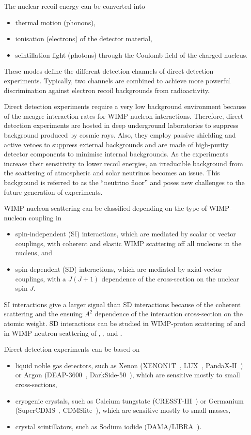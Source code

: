 The nuclear recoil energy can be converted into
\begin{itemize}
    \item thermal motion (phonons),
    \item ionisation (electrons) of the detector material,
    \item scintillation light (photons) through the Coulomb field of the charged nucleus.
\end{itemize}
These modes define the different detection channels of direct detection experiments. Typically, two channels are combined to achieve more powerful discrimination against electron recoil backgrounds from radioactivity.

Direct detection experiments require a very low background environment because of the meagre interaction rates for WIMP-nucleon interactions. Therefore, direct detection experiments are hosted in deep underground laboratories to suppress background produced by cosmic rays. Also, they employ passive shielding and active vetoes to suppress external backgrounds and are made of high-purity detector components to minimise internal backgrounds.
As the experiments increase their sensitivity to lower recoil energies, an irreducible background from the scattering of atmospheric and solar neutrinos becomes an issue. This background is referred to as the ``neutrino floor'' and poses new challenges to the future generation of experiments.

WIMP-nucleon scattering can be classified depending on the type of WIMP-nucleon coupling in
\begin{itemize}
    \item spin-independent (SI) interactions, which are mediated by scalar or vector couplings, with coherent and elastic WIMP scattering off all nucleons in the nucleus, and
    \item spin-dependent (SD) interactions, which are mediated by axial-vector couplings, with a \(J(J+1)\) dependence of the cross-section on the nuclear spin \(J\).
\end{itemize}
SI interactions give a larger signal than SD interactions because of the coherent scattering and the ensuing \(A^2\) dependence of the interaction cross-section on the atomic weight. SD interactions can be studied in WIMP-proton scattering of  and in WIMP-neutron scattering of , , and .

Direct detection experiments can be based on
\begin{itemize}
    \item liquid noble gas detectors, such as Xenon (XENON1T~\cite{Aprile2017}, LUX~\cite{Akerib2013}, PandaX-II~\cite{Tan2016}) or Argon (DEAP-3600~\cite{Amaudruz2018}, DarkSide-50~\cite{Agnes2018}), which are sensitive mostly to small cross-sections,
    \item cryogenic crystals, such as Calcium tungstate (CRESST-III~\cite{Abdelhameed2019}) or Germanium (SuperCDMS~\cite{Agnese2018}, CDMSlite~\cite{Agnese2019}), which are sensitive mostly to small masses,
    \item crystal scintillators, such as Sodium iodide (DAMA/LIBRA~\cite{Bernabei2018}).
\end{itemize}

